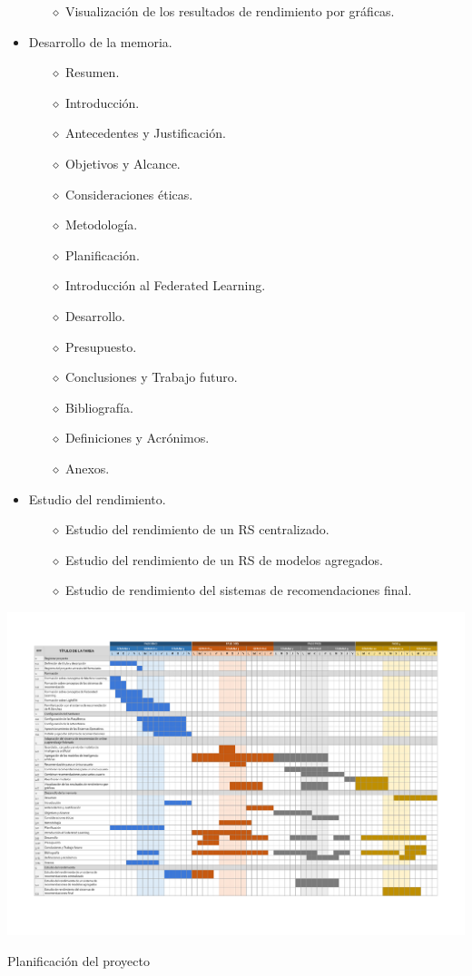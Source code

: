 \begin{itemize}
\begin{itemize}
            \item [$\diamond$]Visualización de los resultados de rendimiento por gráficas.
        \end{itemize}
    \item Desarrollo de la memoria.
        \begin{itemize}
            \item [$\diamond$]Resumen.
            \item [$\diamond$]Introducción.
            \item [$\diamond$]Antecedentes y Justificación.
            \item [$\diamond$]Objetivos y Alcance.
            \item [$\diamond$]Consideraciones éticas.
            \item [$\diamond$]Metodología.
            \item [$\diamond$]Planificación.
            \item [$\diamond$]Introducción al Federated Learning.
            \item [$\diamond$]Desarrollo.
            \item [$\diamond$]Presupuesto.
            \item [$\diamond$]Conclusiones y Trabajo futuro.
            \item [$\diamond$]Bibliografía.
            \item [$\diamond$]Definiciones y Acrónimos.
            \item [$\diamond$]Anexos.
        \end{itemize}
    \item Estudio del rendimiento.
        \begin{itemize}
            \item [$\diamond$]Estudio del rendimiento de un RS centralizado.
            \item [$\diamond$]Estudio del rendimiento de un RS de modelos agregados.
            \item [$\diamond$]Estudio de rendimiento del sistemas de recomendaciones final.
        \end{itemize}
\end{itemize}
\newpage
\begin{table}
    \includegraphics[angle=90,  width=\linewidth, height=\textheight]{PDF/GanttPlanificacion}
    \caption{Planificación del proyecto}\label{table:planificacion}
\end{table}